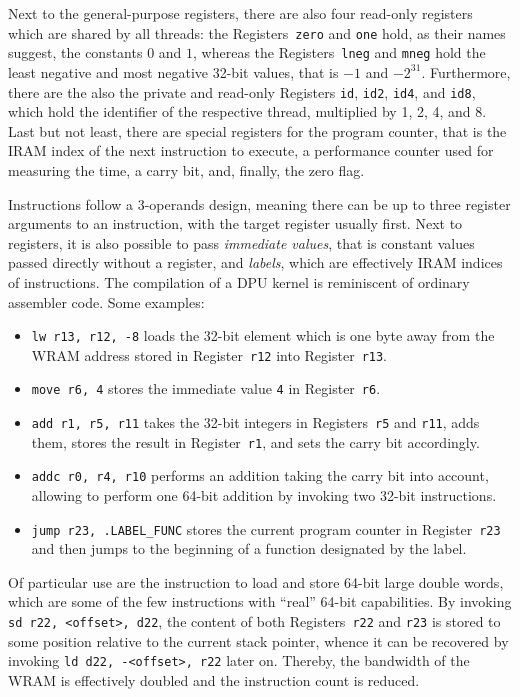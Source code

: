 Next to the general-purpose registers, there are also four read-only registers which are shared by all threads:
the Registers~\lstinline|zero| and \lstinline|one| hold, as their names suggest, the constants \(0\) and \(1\), whereas the Registers~\lstinline|lneg| and \lstinline|mneg| hold the least negative and most negative 32-bit values, that is \(-1\) and \(-2^{31}\).
Furthermore, there are the also the private and read-only Registers \lstinline|id|, \lstinline|id2|, \lstinline|id4|, and \lstinline|id8|, which hold the identifier of the respective thread, multiplied by 1, 2, 4, and 8.
Last but not least, there are special registers for the program counter, that is the \ac{IRAM} index of the next instruction to execute, a performance counter used for measuring the time, a carry bit, and, finally, the zero flag.

Instructions follow a 3-operands design, meaning there can be up to three register arguments to an instruction, with the target register usually first.
Next to registers, it is also possible to pass \emph{immediate values}, that is constant values passed directly without a register, and \emph{labels}, which are effectively \ac{IRAM} indices of instructions.
The compilation of a \ac{DPU} kernel is reminiscent of ordinary assembler code.
Some examples:
\begin{itemize}
	\item
	\lstinline|lw r13, r12, -8| loads the 32-bit element which is one byte away from the \ac{WRAM} address stored in Register~\lstinline|r12| into Register~\lstinline|r13|.

	\item
	\lstinline|move r6, 4| stores the immediate value \lstinline|4| in Register~\lstinline|r6|.

	\item
	\lstinline|add r1, r5, r11| takes the 32-bit integers in Registers~\lstinline|r5| and \lstinline|r11|, adds them, stores the result in Register~\lstinline|r1|, and sets the carry bit accordingly.

	\item
	\lstinline|addc r0, r4, r10| performs an addition taking the carry bit into account, allowing to perform one 64-bit addition by invoking two 32-bit instructions.

	\item
	\lstinline|jump r23, .LABEL_FUNC| stores the current program counter in Register~\lstinline|r23| and then jumps to the beginning of a function designated by the label.
\end{itemize}
Of particular use are the instruction to load and store 64-bit large double words, which are some of the few instructions with \enquote{real} 64-bit capabilities.
By invoking \lstinline|sd r22, <offset>, d22|, the content of both Registers~\lstinline|r22| and \lstinline|r23| is stored to some position relative to the current stack pointer, whence it can be recovered by invoking \lstinline|ld d22, -<offset>, r22| later on.
Thereby, the bandwidth of the \ac{WRAM} is effectively doubled and the instruction count is reduced.

